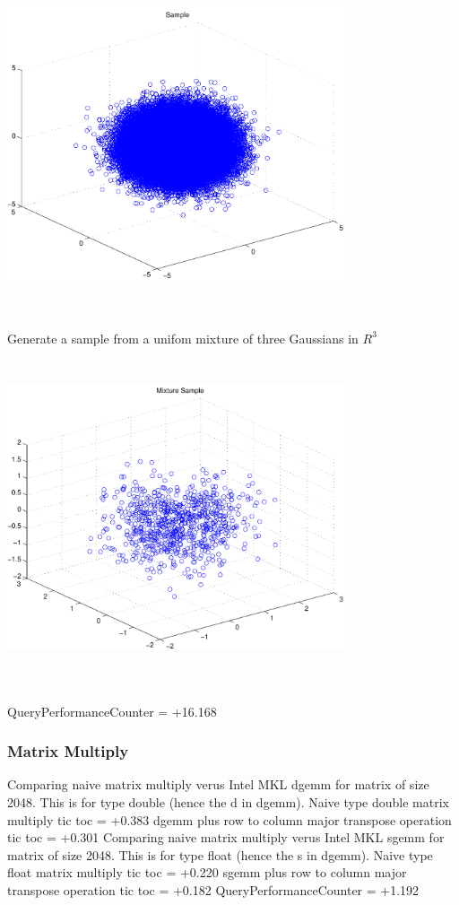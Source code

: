\documentclass[9pt]{article}
\theoremstyle{plain}
\theoremstyle{definition}
\theoremstyle{remark}
\numberwithin{equation}{section}
\begin{document}
\includegraphics[width=10.0cm,height=10.0cm]{R_3_Normal.pdf}

Generate a sample from a unifom mixture of three Gaussians in $R^3$
\includegraphics[width=10.0cm,height=10.0cm]{R_3_Normal_Mixture.pdf}

QueryPerformanceCounter  =  +16.168
\subsubsection{Matrix Multiply}
Comparing naive matrix multiply verus Intel MKL dgemm for matrix of size 2048.
This is for type double (hence the d in dgemm).
Naive type double matrix multiply tic toc  =  +0.383
dgemm plus row to column major transpose operation tic toc  =  +0.301
Comparing naive matrix multiply verus Intel MKL sgemm for matrix of size 2048.
This is for type float (hence the s in dgemm).
Naive type float matrix multiply tic toc  =  +0.220
sgemm plus row to column major transpose operation tic toc  =  +0.182
QueryPerformanceCounter  =  +1.192
\end{document}
